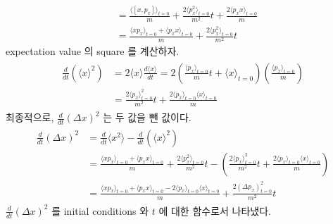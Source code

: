 \documentclass[floatfix,nofootinbib,superscriptaddress,fleqn]{revtex4}
\begin{document}
\begin{itemize}
\begin{align}
    &=\frac{\langle[x,p_x]\rangle_{t=0}}{m}
    +\frac{2\langle p_x^2\rangle_{t=0}}{m^2}t
    +\frac{2\langle p_xx\rangle_{t=0}}{m} \\
    &=\frac{\langle xp_x\rangle_{t=0}+\langle p_xx\rangle_{t=0}}{m}
    +\frac{2\langle p_x^2\rangle_{t=0}}{m^2}t
  \end{align}
expectation value 의 square 를 계산하자.
  \begin{align}
    \begin{split}
      \frac{d}{dt}\left(\langle x \rangle^2\right) 
      &=2\langle x\rangle\frac{d\langle x\rangle}{dt}
      =2\left(\frac{\langle p_x\rangle_{t=0}}{m}t
      +\langle x\rangle_{t=0}\right)\left(\frac{\langle p_x\rangle_{t=0}}{m}\right)  \\
      &=\frac{2\langle p_x\rangle_{t=0}^2}{m^2}t
      +\frac{2\langle p_x\rangle_{t=0}\langle x\rangle_{t=0}}{m}
    \end{split}
  \end{align}
 최종적으로, $\frac{d}{dt}(\Delta x)^2 $ 는 두 값을 뺀 값이다.
  \begin{align}
    \begin{split}
      \frac{d}{dt}(\Delta x)^2 
      &=\frac{d}{dt}\langle x^2 \rangle
      -\frac{d}{dt}\left(\langle x \rangle^2\right) \\
      &=\frac{\langle xp_x\rangle_{t=0}+\langle p_xx\rangle_{t=0}}{m}
      +\frac{2\langle p_x^2\rangle_{t=0}}{m^2}t
      -\left(\frac{2\langle p_x\rangle_{t=0}^2}{m^2}t
      +\frac{2\langle p_x\rangle_{t=0}\langle x\rangle_{t=0}}{m}
      \right) \\
      &=\frac{\langle xp_x\rangle_{t=0}+\langle p_xx\rangle_{t=0}
      -2\langle p_x\rangle_{t=0}\langle x\rangle_{t=0}}{m}
      +\frac{2\left(\Delta p_x\right)^2_{t=0}}{m^2}t
    \end{split}
  \end{align}
  $\frac{d}{dt}(\Delta x)^2 $ 를 initial conditions 와 $t$ 에 대한 함수로서 나타냈다.
\end{itemize} 
\newpage
\end{document}
